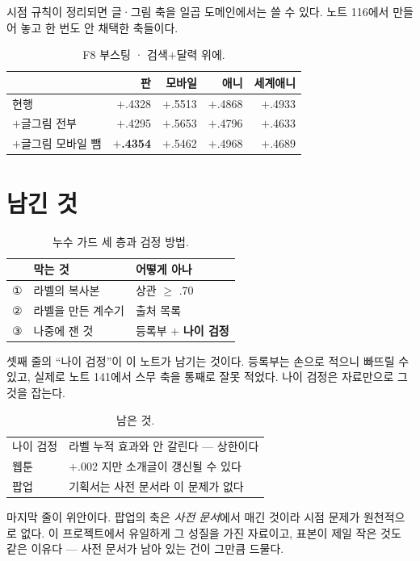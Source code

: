\documentclass[10pt]{article}
\begin{document}
시점 규칙이 정리되면 글·그림 축을 일곱 도메인에서는 쓸 수 있다. 노트
116에서 만들어 놓고 한 번도 안 채택한 축들이다.

\begin{table}[t]
\centering\tsize
\caption{F8 부스팅 · 검색$+$달력 위에.}
\begin{tabular}{lrrrr}
\toprule
& 판 & 모바일 & 애니 & 세계애니 \\
\midrule
현행 & $+$.4328 & $+$.5513 & $+$.4868 & $+$.4933 \\
$+$글그림 전부 & $+$.4295 & $+$.5653 & $+$.4796 & $+$.4633 \\
$+$글그림 모바일 뺌 & \textbf{$+$.4354} & $+$.5462 & $+$.4968 & $+$.4689 \\
\bottomrule
\end{tabular}
\end{table}


\section{남긴 것}

\begin{table}[t]
\centering\tsize
\caption{누수 가드 세 층과 검정 방법.}
\begin{tabular}{lll}
\toprule
& 막는 것 & 어떻게 아나 \\
\midrule
① & 라벨의 복사본 & 상관 $\ge$ .70 \\
② & 라벨을 만든 계수기 & 출처 목록 \\
③ & 나중에 잰 것 & 등록부 $+$ \textbf{나이 검정} \\
\bottomrule
\end{tabular}
\end{table}

셋째 줄의 ``나이 검정''이 이 노트가 남기는 것이다. 등록부는 손으로 적으니
빠뜨릴 수 있고, 실제로 노트 141에서 스무 축을 통째로 잘못 적었다. 나이
검정은 자료만으로 그것을 잡는다.

\begin{table}[t]
\centering\tsize
\caption{남은 것.}
\begin{tabular}{ll}
\toprule
나이 검정 & 라벨 누적 효과와 안 갈린다 --- 상한이다 \\
웹툰 & $+$.002 지만 소개글이 갱신될 수 있다 \\
팝업 & 기획서는 사전 문서라 이 문제가 없다 \\
\bottomrule
\end{tabular}
\end{table}

마지막 줄이 위안이다. 팝업의 축은 \emph{사전 문서}에서 매긴 것이라 시점
문제가 원천적으로 없다. 이 프로젝트에서 유일하게 그 성질을 가진 자료이고,
표본이 제일 작은 것도 같은 이유다 --- 사전 문서가 남아 있는 건이 그만큼
드물다.
\end{document}
